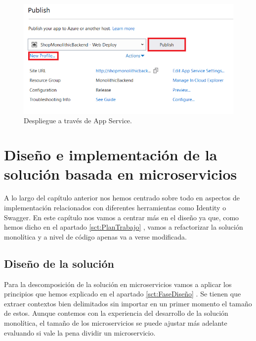 \documentclass[11pt,spanish,listoffigures]{tfgetsinf}
\begin{document}
\begin{enumerate}
\begin{figure}[h]
\centering
\includegraphics[scale=0.6]{AppService3}
\caption{Despliegue a través de App Service.}
\label{fig:AppService3}
\end{figure}

\end{enumerate}

%

\chapter{Diseño e implementación de la solución basada en microservicios}

A lo largo del capítulo anterior nos hemos centrado sobre todo en aspectos de implementación relacionados con diferentes herramientas como Identity o Swagger. En este capítulo nos vamos a centrar más en el diseño ya que, como hemos dicho en el apartado \ref{sct:PlanTrabajo} , vamos a refactorizar la solución monolítica y a nivel de código apenas va a verse modificada.

\section{Diseño de la solución}

Para la descomposición de la solución en microservicios vamos a aplicar los principios que hemos explicado en el apartado \ref{sct:FaseDiseño} . Se tienen que extraer contextos bien delimitados sin importar en un primer momento el tamaño de estos. Aunque contemos con la experiencia del desarrollo de la solución monolítica, el tamaño de los microservicios se puede ajustar más adelante evaluando si vale la pena dividir un microservicio.
\end{document}
